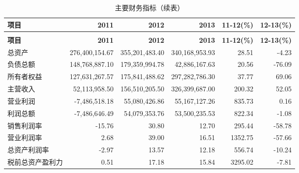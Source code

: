 \renewcommand*{\arraystretch}{0.8}
\setlength{\tabcolsep}{6pt}
\begin{longtable}{>{\footnotesize}l>{\footnotesize}r>{\footnotesize}r>{\footnotesize}r>{\footnotesize}r>{\footnotesize}r}
\caption[主要财务指标]{主要财务指标}\\  %
\hline\hline
\rowcolor{mycyan} {\bfseries \footnotesize  项目} & {\bfseries \footnotesize  2011}\hspace{2ex} & {\bfseries \footnotesize   2012}\hspace{2ex} &   {\bfseries \footnotesize   2013}\hspace{2ex}  &{\bfseries \footnotesize  11-12(\%)} &{\bfseries \footnotesize  12-13(\%)} \\  \endfirsthead          %
\caption[]{主要财务指标（续表）} \\ 
\hline\hline
\rowcolor{mycyan} {\bfseries \footnotesize  项目} & {\bfseries \footnotesize  2011}\hspace{2ex} & {\bfseries \footnotesize   2012}\hspace{2ex} &   {\bfseries \footnotesize   2013}\hspace{2ex}  &{\bfseries \footnotesize  11-12(\%)} &{\bfseries \footnotesize  12-13(\%)} \\ \endhead                %
\hline
\endfoot
\hline   %
总资产		& 276,400,154.67		& 355,201,483.40		& 	340,168,953.93		& 28.51		& -4.23\\
负债总额	& 148,768,887.10		& 	179,359,994.78		& 	42,886,167.63		& 20.56		& -76.09\\
所有者权益	& 127,631,267.57		& 	175,841,488.62		& 	297,282,786.30		& 37.77		& 69.06\\
\midrule
主营收入		& 		52,113,958.50	& 	156,510,205.50	& 	326,399,687.00		& 	200.32		& 	52.05\\
营业利润		& 		-7,486,518.18	& 	55,080,426.86	& 	55,167,127.26		& 835.73		& 	0.16\\
利润总额		& 		-7,486,646.49	& 	54,079,353.76	& 	53,500,235.53	& 	822.34		& -1.08\\
\midrule
销售利润率	& -15.76	& 30.80	& 	12.70	& 		295.44		& 		-58.78 \\
营业利润率	& 2.68	& 	39.00	& 16.51		& 	1352.75		& 		-57.66 \\
总资产利润率	& -2.97	& 	13.57	& 	12.18	& 		556.74		& 		-10.24 \\
税前总资产盈利力	& 0.51	& 	17.18	& 	15.84		& 	3295.02			& 	-7.81 \\

\end{longtable}
